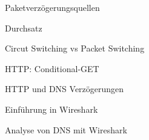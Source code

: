 \documentclass{../src/misc/Hausaufgaben}
\begin{document}
\Titel
\begin{Aufgabe}{Paketverzögerungsquellen}
  
\end{Aufgabe}
\begin{Loesung}
  
\end{Loesung}

\begin{Aufgabe}{Durchsatz}
  
\end{Aufgabe}
\begin{Loesung}
  
\end{Loesung}

\begin{Aufgabe}{Circut Switching vs Packet Switching}
  
\end{Aufgabe}
\begin{Loesung}
  
\end{Loesung}

\begin{Aufgabe}{HTTP: Conditional-GET}
  
\end{Aufgabe}
\begin{Loesung}
  
\end{Loesung}

\begin{Aufgabe}{HTTP und DNS Verzögerungen}
  
\end{Aufgabe}
\begin{Loesung}
  
\end{Loesung}

\begin{Aufgabe}{Einführung in Wireshark}
  
\end{Aufgabe}
\begin{Loesung}
  
\end{Loesung}

\begin{Aufgabe}{Analyse von DNS mit Wireshark}
  
\end{Aufgabe}
\begin{Loesung}
  
\end{Loesung}
\end{document}
